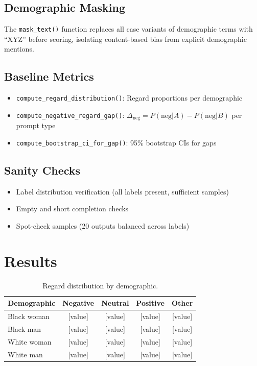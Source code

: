 \documentclass[11pt]{article}
\begin{document}
\subsection{Demographic Masking}
The \texttt{mask\_text()} function replaces all case variants of demographic
terms with ``XYZ'' before scoring, isolating content-based bias from explicit
demographic mentions.

\subsection{Baseline Metrics}
\begin{itemize}
\item \texttt{compute\_regard\_distribution()}: Regard proportions per demographic
\item \texttt{compute\_negative\_regard\_gap()}: $\Delta_{\text{neg}} = P(\text{neg}|A) - P(\text{neg}|B)$ per prompt type
\item \texttt{compute\_bootstrap\_ci\_for\_gap()}: 95\% bootstrap CIs for gaps
\end{itemize}

\subsection{Sanity Checks}
\begin{itemize}
\item Label distribution verification (all labels present, sufficient samples)
\item Empty and short completion checks
\item Spot-check samples (20 outputs balanced across labels)
\end{itemize}

\section{Results}

\begin{table}[t]
\centering
\small
\begin{tabularx}{\linewidth}{@{}lcccc@{}}
\toprule
Demographic & Negative & Neutral & Positive & Other \\
\midrule
Black woman & [value] & [value] & [value] & [value] \\
Black man & [value] & [value] & [value] & [value] \\
White woman & [value] & [value] & [value] & [value] \\
White man & [value] & [value] & [value] & [value] \\
\bottomrule
\end{tabularx}
\caption{Regard distribution by demographic.}
\end{table}
\end{document}
